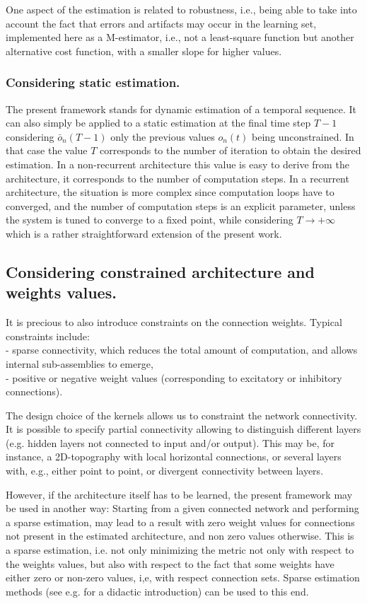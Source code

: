 One aspect of the estimation is related to robustness, i.e., being able to take into account the fact that errors and artifacts may occur in the learning set, implemented here as a M-estimator, i.e., not  a least-square function but another alternative cost function, with a smaller slope for higher values.

\subsubsection*{Considering static estimation.}

The present framework stands for dynamic estimation of a temporal sequence. It can also simply be applied to a static estimation at the final time step $T-1$ considering $\bar{o}_n(T-1)$ only the previous values $o_n(t)$ being unconstrained. In that case the value $T$ corresponds to the number of iteration to obtain the desired estimation. In a non-recurrent architecture this value is easy to derive from the architecture, it corresponds to the number of computation steps. In a recurrent architecture, the situation is more complex since computation loops have to converged, and the number of computation steps is an explicit parameter, unless the system is tuned to converge to a fixed point, while considering $T \rightarrow +\infty$ which is a rather straightforward extension of the present work.

\subsection*{Considering constrained architecture and weights values.}

It is precious to also introduce constraints on the connection weights. Typical constraints include: 
\\- sparse connectivity, which reduces the total amount of computation, and allows internal sub-assemblies to emerge, 
\\- positive or negative weight values (corresponding to excitatory or inhibitory connections).

The design choice of the kernels allows us to constraint the network connectivity. It is possible to specify partial connectivity allowing to distinguish different layers (e.g. hidden layers not connected to input and/or output).
This may be, for instance, a 2D-topography with local horizontal connections, or several layers with, e.g., either point to point, or divergent connectivity between layers.

However, if the architecture itself has to be learned, the present framework may be used in another way: Starting from a given connected network and performing a sparse estimation, may lead to a result with zero weight values for connections not present in the estimated architecture, and non zero values otherwise. This is a sparse estimation, i.e. not only minimizing the metric not only with respect to the weights values, but also with respect to the fact that some weights have either zero or non-zero values, i,e, with respect connection sets. Sparse estimation methods (see e.g. \cite{tropp:04a,tropp:04b} for a didactic introduction) can be used to this end. 

